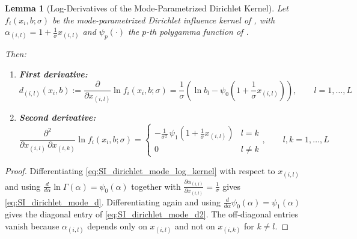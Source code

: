 \documentclass{article}
\newtheorem{lemma}[theorem]{Lemma}
\begin{document}
    \begin{lemma}[Log-Derivatives of the Mode-Parametrized Dirichlet Kernel]
    \label{lem:SI_dirichlet_mode_log_derivs}
        Let $f_i(x_i,b;\sigma)$ be the mode-parametrized Dirichlet influence kernel of , with $\alpha_{(i,l)} = 1 + \frac{1}{\sigma} x_{(i,l)}$ and $\psi_p(\cdot)$ the $p$-th polygamma function of .
        
        Then:
        \begin{enumerate}
            \item \textbf{First derivative:}
            \begin{equation}
                \label{eq:SI_dirichlet_mode_d}
                d_{(i,l)}(x_i,b)
                := \frac{\partial}{\partial x_{(i,l)}} \ln f_i(x_i,b;\sigma)
                = \frac{1}{\sigma}\!\left(\ln b_l - \psi_0(1+\frac{1}{\sigma} x_{(i,l)})\right),
                \qquad l = 1,\ldots,L
            \end{equation}
            \item \textbf{Second derivative:}
            \begin{equation}
                \label{eq:SI_dirichlet_mode_d2}
                \frac{\partial^2}{\partial x_{(i,l)}\,\partial x_{(i,k)}} \ln f_i(x_i,b;\sigma)
                = \begin{cases}
                    -\frac{1}{\sigma^2}\,\psi_1(1+\frac{1}{\sigma} x_{(i,l)}) & l = k \\
                    0 & l \neq k
                \end{cases}, \qquad l,k = 1,\ldots,L
            \end{equation}
        \end{enumerate}
    \end{lemma}

    \begin{proof}
        Differentiating \cref{eq:SI_dirichlet_mode_log_kernel} with respect to $x_{(i,l)}$ and using $\frac{d}{d\alpha}\ln\Gamma(\alpha) = \psi_0(\alpha)$ together with $\frac{\partial \alpha_{(i,l)}}{\partial x_{(i,l)}} = \frac{1}{\sigma} $ gives \cref{eq:SI_dirichlet_mode_d}.
        Differentiating again and using $\frac{d}{d\alpha}\psi_0(\alpha) = \psi_1(\alpha)$ gives the diagonal entry of \cref{eq:SI_dirichlet_mode_d2}.
        The off-diagonal entries vanish because $\alpha_{(i,l)}$ depends only on $x_{(i,l)}$ and not on $x_{(i,k)}$ for $k \neq l$.
    \end{proof}
\end{document}
